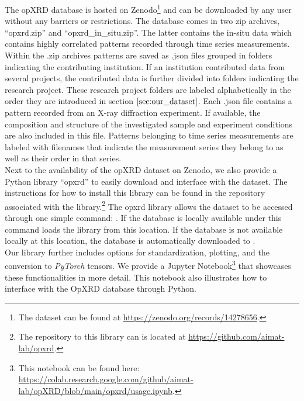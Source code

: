 The opXRD database is hosted on Zenodo\footnote{The dataset can be found at \url{https://zenodo.org/records/14278656}.} and can be downloaded by any user without any barriers or restrictions. The database comes in two zip archives, ``opxrd.zip'' and ``opxrd\_in\_situ.zip''. The latter contains the in-situ data which contains highly correlated patterns recorded through time series measurements. Within the .zip archives patterns are saved as .json files grouped in folders indicating the contributing institution. If an institution contributed data from several projects, the contributed data is further divided into folders indicating the research project. These research project folders are labeled alphabetically in the order they are introduced in section $\eqref{sec:our_dataset}$. Each .json file contains a pattern recorded from an X-ray diffraction experiment. If available, the composition and structure of the investigated sample and experiment conditions are also included in this file. Patterns belonging to time series measurements are labeled with filenames that indicate the measurement series they belong to as well as their order in that series. \\

Next to the availability of the opXRD dataset on Zenodo, we also provide a Python library ``opxrd'' to easily download and interface with the dataset. The instructions for how to install this library can be found in the repository associated with the library.\footnote{The repository to this library can is located at \url{https://github.com/aimat-lab/opxrd}.} The opxrd library allows the dataset to be accessed through one simple command: . If the database is locally available under  this command loads the library from this location. If the database is not available locally at this location, the database is automatically downloaded to . \\

Our library further includes options for standardization, plotting, and the conversion to \emph{PyTorch} tensors. We provide a Jupyter Notebook\footnote{This notebook can be found here: \url{https://colab.research.google.com/github/aimat-lab/opXRD/blob/main/opxrd/usage.ipynb}.} that showcases these functionalities in more detail. This notebook also illustrates how to interface with the OpXRD database through Python. 